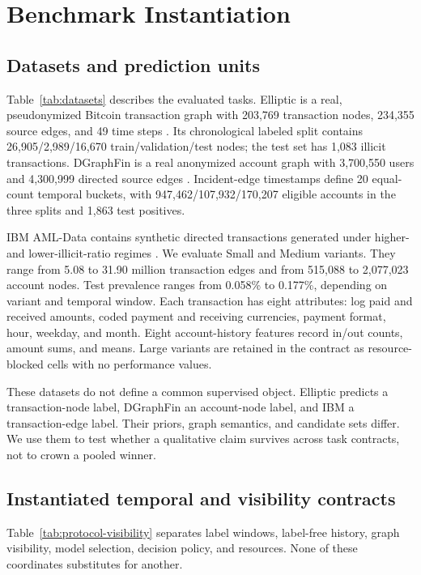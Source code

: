 \section{Benchmark Instantiation}
\label{sec:instantiation}

\subsection{Datasets and prediction units}
Table~\ref{tab:datasets} describes the evaluated tasks. Elliptic is a real, pseudonymized Bitcoin transaction graph with 203,769 transaction nodes, 234,355 source edges, and 49 time steps \cite{weber2019aml}. Its chronological labeled split contains 26,905/2,989/16,670 train/validation/test nodes; the test set has 1,083 illicit transactions. DGraphFin is a real anonymized account graph with 3,700,550 users and 4,300,999 directed source edges \cite{huang2022dgraph}. Incident-edge timestamps define 20 equal-count temporal buckets, with 947,462/107,932/170,207 eligible accounts in the three splits and 1,863 test positives.

IBM AML-Data contains synthetic directed transactions generated under higher- and lower-illicit-ratio regimes \cite{altman2023ibmaml}. We evaluate Small and Medium variants. They range from 5.08 to 31.90 million transaction edges and from 515,088 to 2,077,023 account nodes. Test prevalence ranges from 0.058\% to 0.177\%, depending on variant and temporal window. Each transaction has eight attributes: log paid and received amounts, coded payment and receiving currencies, payment format, hour, weekday, and month. Eight account-history features record in/out counts, amount sums, and means. Large variants are retained in the contract as resource-blocked cells with no performance values.

These datasets do not define a common supervised object. Elliptic predicts a transaction-node label, DGraphFin an account-node label, and IBM a transaction-edge label. Their priors, graph semantics, and candidate sets differ. We use them to test whether a qualitative claim survives across task contracts, not to crown a pooled winner.



\subsection{Instantiated temporal and visibility contracts}
Table~\ref{tab:protocol-visibility} separates label windows, label-free history, graph visibility, model selection, decision policy, and resources. None of these coordinates substitutes for another.

